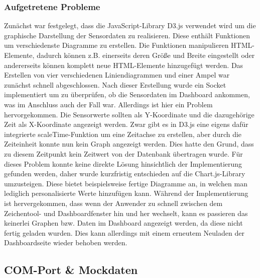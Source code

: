 \documentclass[]{article}
\begin{document}
			\subsubsection{Aufgetretene Probleme}
			Zunächst war festgelegt, dass die JavaScript-Library D3.js verwendet wird um die graphische Darstellung der Sensordaten zu realisieren. Diese enthält Funktionen um verschiedenste Diagramme zu erstellen. Die Funktionen manipulieren HTML-Elemente, dadurch können z.B. einerseits deren Größe und Breite eingestellt oder andererseits können komplett neue HTML-Elemente hinzugefügt werden. Das Erstellen von vier verschiedenen Liniendiagrammen und einer Ampel war zunächst schnell abgeschlossen. Nach dieser Erstellung wurde ein Socket implementiert um zu überprüfen, ob die Sensordaten im Dashboard ankommen, was im Anschluss auch der Fall war. Allerdings ist hier ein Problem hervorgekommen.\newline
			Die Sensorwerte sollten als Y-Koordinate und die dazugehörige Zeit als X-Koordinate angezeigt werden. Zwar gibt es in D3.js eine eigens dafür integrierte scaleTime-Funktion um eine Zeitachse zu erstellen, aber durch die Zeiteinheit konnte nun kein Graph angezeigt werden. Dies hatte den Grund, dass zu diesem Zeitpunkt kein Zeitwert von der Datenbank übertragen wurde. Für dieses Problem konnte keine direkte Lösung hinsichtlich der Implementierung gefunden werden, daher wurde kurzfristig entschieden auf die Chart.js-Library umzusteigen. Diese bietet beispielsweise fertige Diagramme an, in welchen man lediglich personalisierte Werte hinzufügen kann.\newline 
			Während der Implementierung ist hervergekommen, dass wenn der Anwender zu schnell zwischen dem Zeichentool- und Dashboardfenster hin und her wechselt, kann es passieren das keinerlei Graphen bzw. Daten im Dashboard angezeigt werden, da diese nicht fertig geladen wurden. Dies kann allerdings mit einem erneutem Neuladen der Dashboardseite wieder behoben werden. %
			\subsection{COM-Port \& Mockdaten}
			
\end{document}
